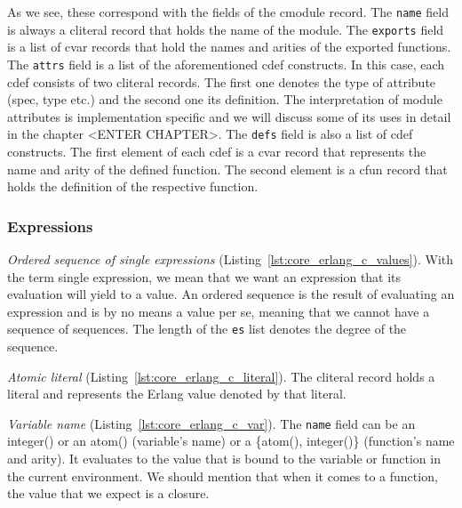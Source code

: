 As we see, these correspond with the fields of the c\textunderscore module record. The \texttt{name}
field is always a c\textunderscore literal record that holds the name of the module. The
\texttt{exports} field is a list of c\textunderscore var records that hold the names and arities of the
exported functions. The \texttt{attrs} field is a list of the aforementioned c\textunderscore def
constructs. In this case, each c\textunderscore def consists of two c\textunderscore literal records. The
first one denotes the type of attribute (spec, type etc.) and the second one
its definition. The interpretation of module attributes is implementation
specific and we will discuss some of its uses in detail in the chapter <ENTER CHAPTER>. The
\texttt{defs} field is also a list of c\textunderscore def constructs. The
first element of each c\textunderscore def is a c\textunderscore var record
that represents the name and arity of the defined function. The second element
is a c\textunderscore fun record that holds the definition of the respective
function.

\subsubsection{Expressions}


\emph{Ordered sequence of single expressions} (Listing~\ref{lst:core_erlang_c_values}).
With the term single expression, we mean that we want an expression that its
evaluation will yield to a value. An ordered sequence is the result of
evaluating an expression and is by no means a value per se, meaning that we
cannot have a sequence of sequences. The length of the \texttt{es} list denotes the
degree of the sequence.


\emph{Atomic literal} (Listing~\ref{lst:core_erlang_c_literal}).
The c\textunderscore literal record holds a  literal and represents the Erlang value denoted
by that literal.



\emph{Variable name} (Listing~\ref{lst:core_erlang_c_var}).
The \texttt{name} field can be an integer() or an atom() (variable’s name) or a \{atom(),
integer()\} (function’s name and arity). It evaluates to the value that is bound
to the variable or function in the current environment. We should mention that
when it comes to a function, the value that we expect is a closure.


